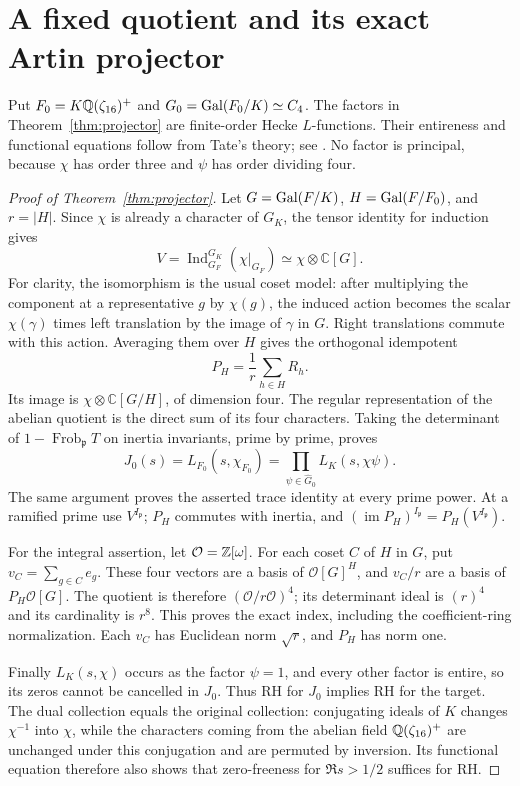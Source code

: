 \section{A fixed quotient and its exact Artin projector}
\label{sec:projector}

Put $F_0=K\mathbb Q(\zeta_{16})^+$ and
$G_0=\operatorname{Gal}(F_0/K)\simeq C_4$. The factors in
Theorem~\ref{thm:projector} are finite-order Hecke $L$-functions.
Their entireness and functional equations follow from Tate's
theory; see \citet[Theorem~5.22]{Poonen2015}. No factor is principal,
because $\chi$ has order three and $\psi$ has order dividing four.

\begin{proof}[Proof of Theorem~\ref{thm:projector}]
Let $G=\operatorname{Gal}(F/K)$, $H=\operatorname{Gal}(F/F_0)$, and $r=|H|$. Since
$\chi$ is already a character of $G_K$, the tensor identity for
induction gives
\[
 V=\operatorname{Ind}_{G_F}^{G_K}(\chi|_{G_F})
        \simeq\chi\otimes\mathbb C[G].
                                                        \tag{10.1}
\]
For clarity, the isomorphism is the usual coset model: after
multiplying the component at a representative $g$ by $\chi(g)$,
the induced action becomes the scalar $\chi(\gamma)$ times
left translation by the image of $\gamma$ in $G$.
Right translations commute with this action. Averaging them over
$H$ gives the orthogonal idempotent
\[
          P_H=\frac1r\sum_{h\in H}R_h.
                                                        \tag{10.2}
\]
Its image is $\chi\otimes\mathbb C[G/H]$, of dimension four.
The regular representation of the abelian quotient is the direct
sum of its four characters. Taking the determinant of
$1-\operatorname{Frob}_{\mathfrak p}T$ on inertia invariants,
prime by prime, proves
\[
 J_0(s)=L_{F_0}(s,\chi_{F_0})
        =\prod_{\psi\in\widehat G_0}L_K(s,\chi\psi).
                                                        \tag{10.3}
\]
The same argument proves the asserted trace identity at every
prime power. At a ramified prime use $V^{I_{\mathfrak p}}$;
$P_H$ commutes with inertia, and
$(\operatorname{im}P_H)^{I_{\mathfrak p}}
=P_H(V^{I_{\mathfrak p}})$.

For the integral assertion, let $\mathcal O=\mathbb Z[\omega]$.
For each coset $C$ of $H$ in $G$, put $v_C=\sum_{g\in C}e_g$.
These four vectors are a basis of $\mathcal O[G]^H$, and
$v_C/r$ are a basis of $P_H\mathcal O[G]$. The quotient is
therefore $(\mathcal O/r\mathcal O)^4$; its determinant ideal
is $(r)^4$ and its cardinality is $r^8$. This proves the exact
index, including the coefficient-ring normalization. Each $v_C$
has Euclidean norm $\sqrt r$, and $P_H$ has norm one.

Finally $L_K(s,\chi)$ occurs as the factor $\psi=1$, and every
other factor is entire, so its zeros cannot be cancelled in
$J_0$. Thus RH for $J_0$ implies RH for the target. The dual
collection equals the original collection: conjugating ideals
of $K$ changes $\chi^{-1}$ into $\chi$, while the characters
coming from the abelian field $\mathbb Q(\zeta_{16})^+$ are unchanged
under this conjugation and are permuted by inversion. Its
functional equation therefore also shows that zero-freeness
for $\Re s>1/2$ suffices for RH.
\end{proof}

